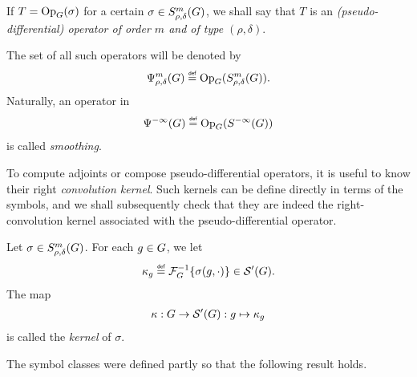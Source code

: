 \begin{definition}
\label{definition:operator_classes}
    If $T = \mathrm{Op}_{G}(\sigma)$ for a certain $\sigma \in S^{m}_{\rho, \delta}(G)$,
    we shall say that $T$ is an \emph{(pseudo-differential) operator of order $m$ and of type $(\rho, \delta)$}.

    The set of all such operators will be denoted by
    \begin{align*}
        \OperatorClass{m}{\rho, \delta} \defeq \Op(\SymbolClass{m}{\rho, \delta}).
    \end{align*}
    Naturally, an operator in
    \begin{align*}
        \SmoothingOperators \defeq \Op(\SmoothingSymbols)
    \end{align*}
    is called \emph{smoothing}.
\end{definition}

To compute adjoints or compose pseudo-differential operators,
it is useful to know their right \emph{convolution kernel}.
Such kernels can be define directly in terms of the symbols,
and we shall subsequently check that they are indeed the right-convolution kernel
associated with the pseudo-differential operator.

\begin{definition}
\label{definition:kernel_of_symbol}
    Let $\sigma \in S^{m}_{\rho, \delta}(G)$.
    For each $g \in G$, we let
    \begin{align*}
        \kappa_g \defeq \InverseFourier\{\sigma(g, \dummy)\} \in \TemperedDistributions\Group.
    \end{align*}
    The map
    \begin{align*}
        \kappa : G \to {\mathcal{S}' (G)} : g \mapsto \kappa_g
    \end{align*}
    is called the \emph{kernel} of $\sigma$.
\end{definition}

The symbol classes were defined partly so that the following result holds.

